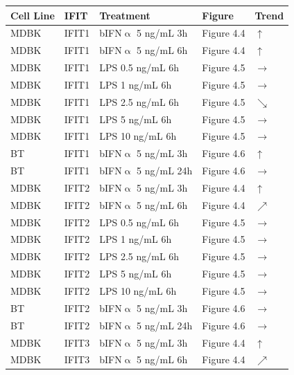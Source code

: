 \begin{table}
    \centering
    \begin{tabular}{lllll}
    \hline
        \textbf{Cell Line} & \textbf{IFIT} & \textbf{Treatment} & \textbf{Figure} & \textbf{Trend} \\ \hline
        MDBK & IFIT1 & bIFN$\upalpha$ 5 ng/mL 3h & Figure 4.4 & \(\uparrow\) \\ 
        MDBK & IFIT1 & bIFN$\upalpha$ 5 ng/mL 6h & Figure 4.4 & \(\uparrow\) \\ 
        MDBK & IFIT1 & LPS 0.5 ng/mL 6h & Figure 4.5 & \(\rightarrow\) \\ 
        MDBK & IFIT1 & LPS 1 ng/mL 6h & Figure 4.5 & \(\rightarrow\) \\ 
        MDBK & IFIT1 & LPS 2.5 ng/mL 6h & Figure 4.5 & \(\searrow\) \\ 
        MDBK & IFIT1 & LPS 5 ng/mL 6h & Figure 4.5 & \(\rightarrow\) \\ 
        MDBK & IFIT1 & LPS 10 ng/mL 6h & Figure 4.5 & \(\rightarrow\) \\ 
        BT & IFIT1 & bIFN$\upalpha$ 5 ng/mL 3h & Figure 4.6 & \(\uparrow\) \\ 
        BT & IFIT1 & bIFN$\upalpha$ 5 ng/mL 24h & Figure 4.6 & \(\rightarrow\) \\ 
        MDBK & IFIT2 & bIFN$\upalpha$ 5 ng/mL 3h & Figure 4.4 & \(\uparrow\) \\ 
        MDBK & IFIT2 & bIFN$\upalpha$ 5 ng/mL 6h & Figure 4.4 & \(\nearrow\) \\ 
        MDBK & IFIT2 & LPS 0.5 ng/mL 6h & Figure 4.5 & \(\rightarrow\) \\ 
        MDBK & IFIT2 & LPS 1 ng/mL 6h & Figure 4.5 & \(\rightarrow\) \\ 
        MDBK & IFIT2 & LPS 2.5 ng/mL 6h & Figure 4.5 & \(\rightarrow\) \\ 
        MDBK & IFIT2 & LPS 5 ng/mL 6h & Figure 4.5 & \(\rightarrow\) \\ 
        MDBK & IFIT2 & LPS 10 ng/mL 6h & Figure 4.5 & \(\rightarrow\) \\ 
        BT & IFIT2 & bIFN$\upalpha$ 5 ng/mL 3h & Figure 4.6 & \(\rightarrow\) \\ 
        BT & IFIT2 & bIFN$\upalpha$ 5 ng/mL 24h & Figure 4.6 & \(\rightarrow\) \\ 
        MDBK & IFIT3 & bIFN$\upalpha$ 5 ng/mL 3h & Figure 4.4 & \(\uparrow\) \\ 
        MDBK & IFIT3 & bIFN$\upalpha$ 5 ng/mL 6h & Figure 4.4 & \(\nearrow\) \\ 

\end{tabular}
\end{table}

